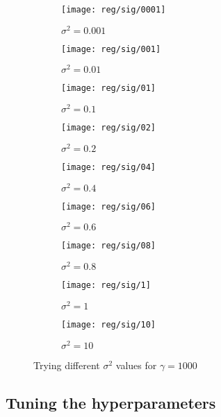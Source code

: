 \documentclass[conference,compsoc]{IEEEtran}
\begin{document}
\begin{figure}[htb]
    \centering %


\begin{subfigure}{0.33\textwidth}
  \texttt{[image: reg/sig/0001]}
  \caption{$\sigma^2=0.001$}
  \label{fig:4}
\end{subfigure}\hfil %
\begin{subfigure}{0.33\textwidth}
  \texttt{[image: reg/sig/001]}
  \caption{$\sigma^2=0.01$}
  \label{fig:5}
\end{subfigure}\hfil %
\begin{subfigure}{0.33\textwidth}
  \texttt{[image: reg/sig/01]}
  \caption{$\sigma^2=0.1$}
  \label{fig:6}
\end{subfigure}



\begin{subfigure}{0.33\textwidth}
  \texttt{[image: reg/sig/02]}
  \caption{$\sigma^2=0.2$}
  \label{fig:4}
\end{subfigure}\hfil %
\begin{subfigure}{0.33\textwidth}
  \texttt{[image: reg/sig/04]}
  \caption{$\sigma^2=0.4$}
  \label{fig:5}
\end{subfigure}\hfil %
\begin{subfigure}{0.33\textwidth}
  \texttt{[image: reg/sig/06]}
  \caption{$\sigma^2=0.6$}
  \label{fig:6}
\end{subfigure}


\begin{subfigure}{0.33\textwidth}
  \texttt{[image: reg/sig/08]}
  \caption{$\sigma^2=0.8$}
  \label{fig:1}
\end{subfigure}\hfil %
\begin{subfigure}{0.33\textwidth}
  \texttt{[image: reg/sig/1]}
  \caption{$\sigma^2=1$}
  \label{fig:2}
\end{subfigure}\hfil %
\begin{subfigure}{0.33\textwidth}
  \texttt{[image: reg/sig/10]}
  \caption{$\sigma^2=10$}
  \label{fig:sig2}
\end{subfigure}

\caption{Trying different $\sigma^2$ values for $\gamma = 1000$}
\label{fig:regsig2}
\end{figure}


\subsection{Tuning the hyperparameters}
\end{document}
